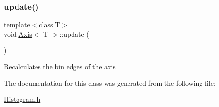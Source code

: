\mbox{\label{class_axis_ae490ee3fdbdfb9a189281f40fc43798c}} 
\subsubsection{\texorpdfstring{update()}{update()}}
{\footnotesize\ttfamily template$<$class T$>$ \\
void \hyperlink{class_axis}{Axis}$<$ T $>$\+::update (\begin{DoxyParamCaption}{ }\end{DoxyParamCaption})\hspace{0.3cm}{\ttfamily [inline]}}

Recalculates the bin edges of the axis 

The documentation for this class was generated from the following file\+:\begin{DoxyCompactItemize}
\item 
\hyperlink{_histogram_8h}{Histogram.\+h}\end{DoxyCompactItemize}
